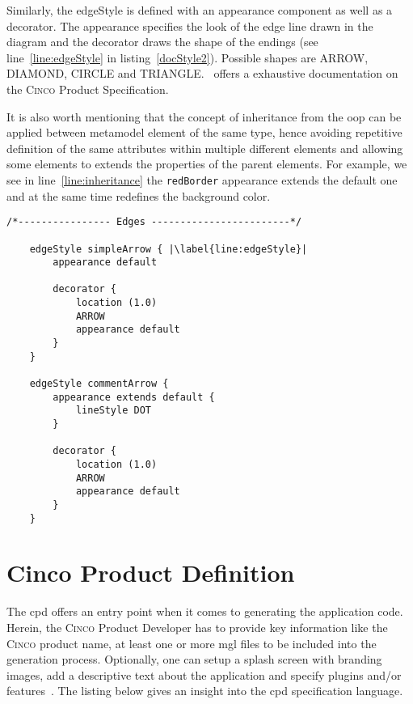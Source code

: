 Similarly, the edgeStyle is defined with an appearance component as well as a decorator. The appearance specifies the look of the edge line drawn in the diagram and the decorator draws the shape of the endings (see line~\ref{line:edgeStyle} in listing~\ref{docStyle2}). Possible shapes are ARROW, DIAMOND, CIRCLE and TRIANGLE\@.~\cite{gitlabcinco} offers a exhaustive documentation on the \textsc{Cinco} Product Specification.

It is also worth mentioning that the concept of inheritance from the \acrfull{oop} can be applied between metamodel element of the same type, hence avoiding repetitive definition of the same attributes within multiple different elements and allowing some elements to extends the properties of the parent elements. For example, we see in line~\ref{line:inheritance} the \lstinline{redBorder} appearance extends the default one and at the same time redefines the background color.

\begin{lstlisting}[language=MGL, caption={Doc.style part 2}, label=docStyle2, escapechar=|, name=docMSL]
    /*---------------- Edges ------------------------*/

    edgeStyle simpleArrow { |\label{line:edgeStyle}|
        appearance default

        decorator {
            location (1.0)
            ARROW
            appearance default
        }
    }

    edgeStyle commentArrow {
        appearance extends default {
            lineStyle DOT
        }

        decorator {
            location (1.0)
            ARROW
            appearance default
        }
    }
\end{lstlisting}

\section{Cinco Product Definition}\label{sec:CPD}

The \acrfull{cpd} offers an entry point when it comes to generating the application code. Herein, the \textsc{Cinco} Product Developer has to provide key information like the \textsc{Cinco} product name, at least one or more \acrshort{mgl} files to be included into the generation process. Optionally, one can setup a splash screen with branding images, add a descriptive text about the application and specify plugins and/or features~\cite{gitlabcinco}.
The listing below gives an insight into the \acrshort{cpd} specification language.

